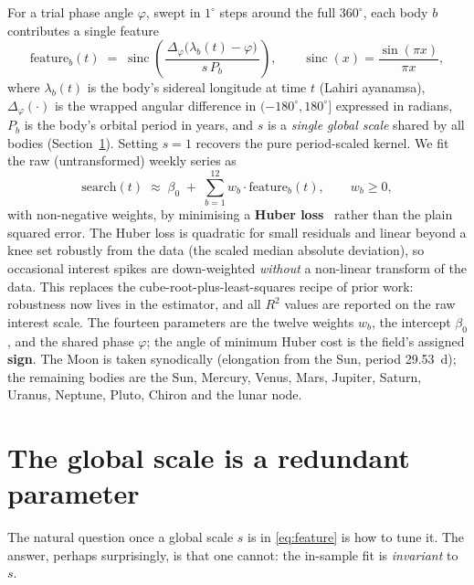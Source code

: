 \documentclass[11pt]{artaquest}
\begin{document}
For a trial phase angle $\varphi$, swept in $1^\circ$ steps around the full $360^\circ$, each body $b$
contributes a single feature
\begin{equation}
  \mathrm{feature}_b(t) \;=\;
  \operatorname{sinc}\!\left(
    \frac{\,\Delta_\varphi\!\big(\lambda_b(t) - \varphi\big)\,}{s\,P_b}
  \right),
  \qquad
  \operatorname{sinc}(x) = \frac{\sin(\pi x)}{\pi x},
  \label{eq:feature}
\end{equation}
where $\lambda_b(t)$ is the body's sidereal longitude at time $t$ (Lahiri ayanamsa), $\Delta_\varphi(\cdot)$
is the wrapped angular difference in $(-180^\circ,180^\circ]$ expressed in radians, $P_b$ is the body's
orbital period in years, and $s$ is a \emph{single global scale} shared by all bodies (Section~\ref{sec:scale}).
Setting $s=1$ recovers the pure period-scaled kernel. We fit the raw (untransformed) weekly series as
\begin{equation}
  \mathrm{search}(t) \;\approx\; \beta_0 \;+\; \sum_{b=1}^{12} w_b \cdot \mathrm{feature}_b(t),
  \qquad w_b \ge 0,
  \label{eq:fit}
\end{equation}
with non-negative weights, by minimising a \textbf{Huber loss}~\citep{huber1964robust} rather than the
plain squared error. The Huber loss is quadratic for small residuals and linear beyond a knee set robustly
from the data (the scaled median absolute deviation), so occasional interest spikes are down-weighted
\emph{without} a non-linear transform of the data. This replaces the cube-root-plus-least-squares recipe
of prior work: robustness now lives in the estimator, and all $R^2$ values are reported on the raw
interest scale. The fourteen parameters are the twelve weights $w_b$, the intercept $\beta_0$, and the
shared phase $\varphi$; the angle of minimum Huber cost is the field's assigned \textbf{sign}. The Moon is
taken synodically (elongation from the Sun, period \SI{29.53}{\day}); the remaining bodies are the Sun,
Mercury, Venus, Mars, Jupiter, Saturn, Uranus, Neptune, Pluto, Chiron and the lunar node.

\section{The global scale is a redundant parameter}
\label{sec:scale}

The natural question once a global scale $s$ is in \eqref{eq:feature} is how to tune it. The answer,
perhaps surprisingly, is that one cannot: the in-sample fit is \emph{invariant} to $s$.
\end{document}

